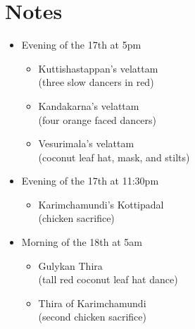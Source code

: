 \documentclass[a4paper, 11pt]{article} %
\begin{document}
\section{Notes}%
  \label{sec:Notes}
  
\begin{itemize}
  \item Evening of the 17th at 5pm
  \begin{itemize}
    \item Kuttishastappan's velattam\\
      (three slow dancers in red)
    \item Kandakarna's velattam\\
      (four orange faced dancers)
    \item Vesurimala's velattam\\
      (coconut leaf hat, mask, and stilts)
  \end{itemize}
  \item Evening of the 17th at 11:30pm
  \begin{itemize}
    \item Karimchamundi's Kottipadal\\
      (chicken sacrifice)
  \end{itemize}
  \item Morning of the 18th at 5am
  \begin{itemize}
    \item Gulykan Thira\\
      (tall red coconut leaf hat dance)
    \item Thira of Karimchamundi\\
      (second chicken sacrifice)
  \end{itemize}
\end{itemize}















\vfill

\end{document}
